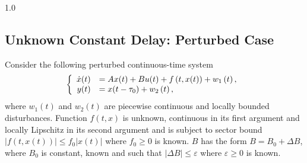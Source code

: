 \documentclass[journal]{IEEEtran}
\begin{document}
\begin{spacing}{1.0}
%
%

\subsection{Unknown Constant Delay: Perturbed Case}

Consider the following perturbed continuous-time system
\begin{equation}
\left\{
\begin{array}
[c]{rl}%
\dot{x}(t) & =Ax(t)+Bu(t)+f\left(  t,x(t)\right)  +w_{1}\left(  t\right)  ,\\
y(t) & =x(t-\tau_{0})+w_{2}\left(  t\right)  ,
\end{array}
\right.  \label{sss1}%
\end{equation}
where $w_{1}(t)$ and $w_{2}(t)$ are piecewise continuous and locally bounded disturbances. Function
$f(t,x)$ is unknown, continuous in its first argument and locally Lipschitz in
its second argument and is subject to sector bound $|f(t,x(t))|\leq
f_{0}|x(t)|$ where $f_{0}\geq0$ is known. $B$ has the form $B=B_{0}+\mathit{\Delta
}B$, where $B_{0}$ is constant, known and such that $|\mathit{\Delta}%
B|\leq\varepsilon$ where $\varepsilon\geq0$ is known.


\end{spacing}
\end{document}
